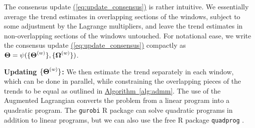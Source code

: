 \documentclass[12pt]{article}
\newcommand{\Eqn}[1]{\hyperref[eq:#1]{{\rm (\ref*{eq:#1})}}} %
\newcommand{\Alg}[1]{\hyperref[alg:#1]{Algorithm~\ref*{alg:#1}}} %
\newcommand{\Eqn}[1]{{(\ref{eq:#1})}} %
\newcommand{\Alg}[1]{{Algorithm~\ref{alg:#1}}} %
\newcommand{\M}[1]{{\bm{\mathbf{\MakeUppercase{#1}}}}} %
\newcommand{\Mn}[2]{\M{#1}^{(#2)}} %
\begin{document}
The consensus update \Eqn{update_consensus} is rather intuitive. We essentially average the trend estimates in overlapping sections of the windows, subject to some adjustment by the Lagrange multipliers, and leave the trend estimates in non-overlapping sections of the windows untouched.
For notational ease, we write the consensus update \Eqn{update_consensus} compactly as $\M{\Theta} = \psi(\{\Mn{\Theta}{w}\},\{\Mn{\Omega}{w}\})$.

{\bf Updating $\{\Mn{\Theta}{w}\}$: } We then estimate the trend separately in each window, which can be done in parallel, while constraining the overlapping pieces of the trends to be equal as outlined in \Alg{admm}. The use of the Augmented Lagrangian converts the problem from a linear program into a quadratic program. The \texttt{gurobi} R package \citep{gurobi} can solve quadratic programs in addition to linear programs, but we can also use the free R package \texttt{quadprog} \citep{quadprog}.
\end{document}

